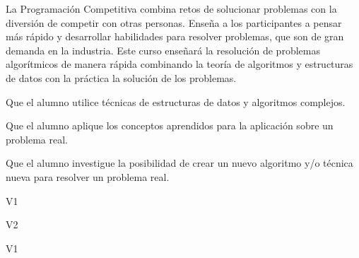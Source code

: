 \begin{syllabus}


\begin{justification}
La Programación Competitiva combina retos de solucionar problemas con la diversión de competir con otras personas. Enseña a los participantes a pensar más rápido y desarrollar habilidades para resolver problemas, que son de gran demanda en la industria. 
Este curso enseñará la resolución de problemas algorítmicos de manera rápida combinando la teoría de algoritmos y estructuras de datos con la práctica la solución de los problemas.
\end{justification}

\begin{goals}
\item Que el alumno utilice técnicas de estructuras de datos y algoritmos complejos.
\item Que el alumno aplique los conceptos aprendidos para la aplicación sobre un problema real.
\item Que el alumno investigue la posibilidad de crear un nuevo algoritmo y/o técnica nueva para resolver un problema real.
\end{goals}

\begin{outcomes}{V1}
    \item {}
    \item {}
    \item {}
\end{outcomes}

\begin{outcomes}{V2}
    \item {}
    \item {}
    \item {}
    \item {}
\end{outcomes}

\begin{competences}{V1}
    \item {}
    \item {}
    \item {}
\end{competences}


\end{syllabus}
